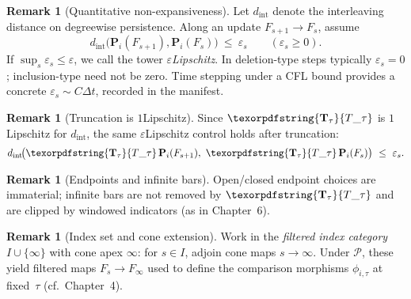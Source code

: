 \documentclass[11pt]{article}
\numberwithin{equation}{section}
\theoremstyle{plain}
\theoremstyle{definition}
\theoremstyle{remark}
\DeclareRobustCommand{\hyp}{\nobreakdash-}
\theoremstyle{plain}
\theoremstyle{definition}
\numberwithin{equation}{section}
\theoremstyle{definition}
\newtheorem{remark}[theorem]{Remark}
\DeclareRobustCommand{\Ttau}{\texorpdfstring{\ensuremath{\mathbf{T}_{\tau}}}{T\_\tau}}
\numberwithin{equation}{section}
\theoremstyle{plain}
\theoremstyle{definition}
\theoremstyle{remark}
\providecommand{\Tfun}[1]{\mathbf{T}_{#1}}
\providecommand{\Ttau}{\Tfun{\tau}}
\begin{document}
\begin{remark}[Quantitative non\hyp expansiveness]\label{rk:10-epsilon}
Let \(d_{\mathrm{int}}\) denote the interleaving distance on degreewise persistence. Along an update \(F_{s+1}\to F_s\), assume
\[
  d_{\mathrm{int}}\big(\mathbf{P}_i(F_{s+1}),\mathbf{P}_i(F_s)\big)\ \le\ \varepsilon_s\qquad(\varepsilon_s\ge 0).
\]
If \(\sup_s\varepsilon_s\le \varepsilon\), we call the tower \emph{\(\varepsilon\)\nobreakdash Lipschitz}. In deletion\hyp type steps typically \(\varepsilon_s=0\); inclusion\hyp type need not be zero. Time stepping under a CFL bound provides a concrete \(\varepsilon_s\sim C\Delta t\), recorded in the manifest.
\end{remark}

\begin{remark}[Truncation is \(1\)\nobreakdash Lipschitz]
Since \(\Ttau\) is \(1\)\nobreakdash Lipschitz for \(d_{\mathrm{int}}\), the same \(\varepsilon\)\nobreakdash Lipschitz control holds after truncation:
\[
d_{\mathrm{int}}\!\big(\Ttau\,\mathbf{P}_i(F_{s+1}),\ \Ttau\,\mathbf{P}_i(F_s)\big)\ \le\ \varepsilon_s.
\]
\end{remark}

\begin{remark}[Endpoints and infinite bars]\label{rk:10-endpoints}
Open/closed endpoint choices are immaterial; infinite bars are not removed by \(\Ttau\) and are clipped by windowed indicators (as in Chapter~6).
\end{remark}

\begin{remark}[Index set and cone extension]\label{rk:10-cone}
Work in the \emph{filtered index category} \(I\cup\{\infty\}\) with cone apex \(\infty\): for \(s\in I\), adjoin cone maps \(s\to\infty\).
Under \(\mathcal{P}\), these yield filtered maps \(F_s\to F_\infty\) used to define the comparison morphisms \(\phi_{i,\tau}\) at fixed~\(\tau\) (cf.\ Chapter~4).
\end{remark}
\end{document}
